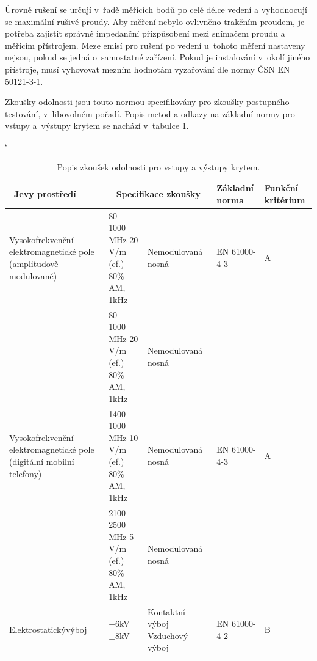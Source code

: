 Úrovně rušení se určují v~řadě měřících bodů po celé délce vedení a vyhodnocují se maximální rušivé proudy. Aby měření nebylo ovlivněno trakčním proudem, je potřeba zajistit správné impedanční přizpůsobení mezi snímačem proudu a měřícím přístrojem. Meze emisí pro rušení po vedení u~tohoto měření nastaveny nejsou, pokud se jedná o~samostatné zařízení. Pokud je instalování v~okolí jiného přístroje, musí vyhovovat mezním hodnotám vyzařování dle normy ČSN EN 50121-3-1.

Zkoušky odolnosti jsou touto normou specifikovány pro zkoušky postupného testování, v~libovolném pořadí. Popis metod a odkazy na základní normy pro vstupy a~výstupy krytem se nachází v~tabulce \ref{tab:emc_odolnosti1}.

\begin{table}[!h]
\catcode`
\begin{center}
  	\caption{Popis zkoušek odolnosti pro vstupy a výstupy krytem.}
  	\label{tab:emc_odolnosti1}
\begin{tabular}{|p{}|p{}|p{}|p{}|p{}|}
	\hline
	{\bf\ Jevy prostředí} 	& \multicolumn{2}{c}{\bf Specifikace zkoušky}\vline & {\bf Základní norma} & {\bf Funkční kritérium} \\
	\hline
	\hline
	Vysokofrekvenční elektromagnetické pole (amplitudově modulované) & 80 - 1000 MHz 20 V/m (ef.) 80\% AM, 1kHz & Nemodulovaná nosná	& \begin{center}EN 61000-4-3 		\end{center}& \begin{center} A~\end{center} \\ 
	\hline
	 & 80 - 1000 MHz 20 V/m (ef.) 80\% AM, 1kHz & Nemodulovaná nosná &   &  \\
	\cline{2-3}
	Vysokofrekvenční elektromagnetické pole (digitální mobilní telefony) & 1400 - 1000 MHz 10 V/m (ef.) 80\% AM, 1kHz & Nemodulovaná nosná & 	\begin{center}  EN 61000-4-3  \end{center} & \begin{center} A~\end{center} \\
	\cline{2-3}
	& 2100 - 2500 MHz 5 V/m (ef.) 80\% AM, 1kHz & Nemodulovaná nosná	&  &  \\
	\hline
	Elektrostatický\linebreak[4]výboj & \begin{center} $\pm$6kV $\pm$8kV \end{center} & Kontaktní výboj \mbox{Vzduchový} výboj &\begin{center}EN 61000-4-2 \end{center} 
	& \begin{center}B\end{center} \\
	\hline
\end{tabular}
\end{center}
\end{table}

